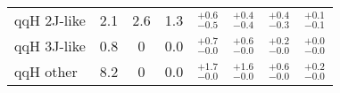 \begin{tabular}{ l | c | c | c | c | c | c | c }
qqH 2J-like  & 2.1                           & 2.6                          & 1.3   & $_{-0.5}^{+0.6}$   & $_{-0.4}^{+0.4}$   & $_{-0.3}^{+0.4}$   & $_{-0.1}^{+0.1}$    \\[3pt]
qqH 3J-like  & 0.8                           & 0                            & 0.0   & $_{-0.0}^{+0.7}$   & $_{-0.0}^{+0.6}$   & $_{-0.0}^{+0.2}$   & $_{-0.0}^{+0.0}$    \\[3pt]
qqH other    & 8.2                           & 0                            & 0.0   & $_{-0.0}^{+1.7}$   & $_{-0.0}^{+1.6}$   & $_{-0.0}^{+0.6}$   & $_{-0.0}^{+0.2}$    \\[3pt]
\end{tabular}
